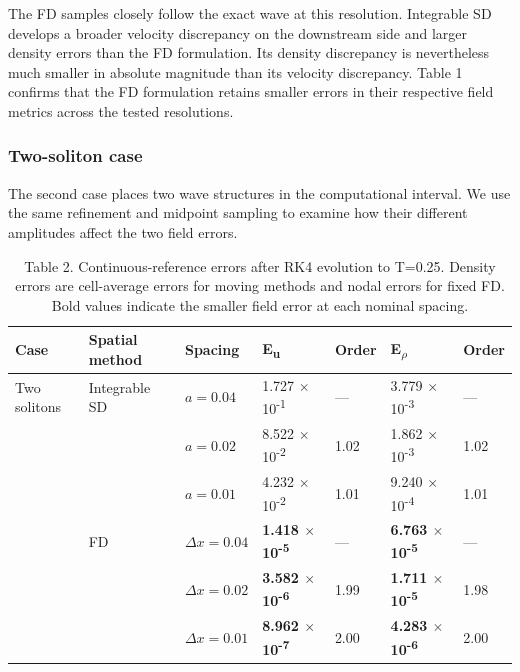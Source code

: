 \documentclass[11pt,a4paper]{article}
\begin{document}
The FD samples closely follow the exact wave at this resolution. Integrable SD develops a broader velocity discrepancy on the downstream side and larger density errors than the FD formulation. Its density discrepancy is nevertheless much smaller in absolute magnitude than its velocity discrepancy. Table 1 confirms that the FD formulation retains smaller errors in their respective field metrics across the tested resolutions.

\subsubsection*{Two-soliton case}

The second case places two wave structures in the computational interval. We use the same refinement and midpoint sampling to examine how their different amplitudes affect the two field errors.

\begin{table}[!htbp]
\centering
\caption*{Table 2. Continuous-reference errors after RK4 evolution to T=0.25. Density errors are cell-average errors for moving methods and nodal errors for fixed FD. Bold values indicate the smaller field error at each nominal spacing.}
\small
\setlength{\tabcolsep}{4pt}
\renewcommand{\arraystretch}{1.22}
\begin{tabularx}{\linewidth}{YYYYYYY}
\toprule
Case & Spatial method & Spacing & E\textsubscript{u} & Order & E\textsubscript{\(\rho\)} & Order \\
\midrule
Two solitons & Integrable SD & \(a=0.04\) & 1.727 \(\times\) 10\textsuperscript{-1} & — & 3.779 \(\times\) 10\textsuperscript{-3} & — \\
 &  & \(a=0.02\) & 8.522 \(\times\) 10\textsuperscript{-2} & 1.02 & 1.862 \(\times\) 10\textsuperscript{-3} & 1.02 \\
 &  & \(a=0.01\) & 4.232 \(\times\) 10\textsuperscript{-2} & 1.01 & 9.240 \(\times\) 10\textsuperscript{-4} & 1.01 \\
 & FD & \(\Delta x=0.04\) & \textbf{1.418 \(\times\) 10\textsuperscript{-5}} & — & \textbf{6.763 \(\times\) 10\textsuperscript{-5}} & — \\
 &  & \(\Delta x=0.02\) & \textbf{3.582 \(\times\) 10\textsuperscript{-6}} & 1.99 & \textbf{1.711 \(\times\) 10\textsuperscript{-5}} & 1.98 \\
 &  & \(\Delta x=0.01\) & \textbf{8.962 \(\times\) 10\textsuperscript{-7}} & 2.00 & \textbf{4.283 \(\times\) 10\textsuperscript{-6}} & 2.00 \\
\bottomrule
\end{tabularx}
\end{table}
\end{document}
